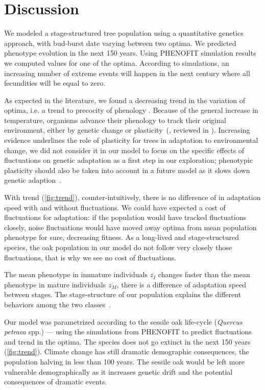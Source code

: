 \label{sec:Disc}
\section*{Discussion}

We modeled a stage-structured tree population using a quantitative genetics approach, with bud-burst date varying between two optima. We predicted phenotype evolution in the next 150 years. Using \textsc{PHENOFIT} simulation results we computed values for one of the optima. According to simulations, an increasing number of extreme events will happen in the next century where all fecundities will be equal to zero.

As expected in the literature, we found a decreasing trend in the variation of optima, i.e. a trend to precocity of phenology \citep{aitken_adaptation_2008, ehrlen_timing_2009}. Because of the general increase in temperature, organisms advance their phenology to track their original environment, either by genetic change or plasticity~(\citealt{savolainen_genetic_2004}, reviewed in \citealt{merila_climate_2014}). Increasing evidence underlines the role of plasticity for trees in adaptation to environmental change, we did not consider it in our model to focus on the specific effects of fluctuations on genetic adaptation as a first step in our exploration; phenotypic plasticity should also be taken into account in a future model as it slows down genetic adaption~\citep{alberto_potential_2013, aitken_adaptation_2008}. 

With trend (\autoref{fig:trend}), counter-intuitively, there is no difference of in adaptation speed with and without fluctuations. We could have expected a cost of fluctuations for adaptation: if the population would have tracked fluctuations closely, noise fluctuations would have moved away optima from mean population phenotype for sure, decreasing fitness. As a long-lived and stage-structured species, the oak population in our model do not follow very closely those fluctuations, that is why we see no cost of fluctuations.

The mean phenotype in immature individuals $\overline{z_I}$ changes faster than the mean phenotype in mature individuals $\overline{z_M}$, there is a difference of adaptation speed between stages. The stage-structure of our population explains the different behaviors among the two classes~\citep{cotto_maladaptation_2014}.

Our model was parametrized according to the sessile oak life-cycle (\textit{Quercus petraea} spp.) — using the simulations from \textsc{PHENOFIT} to predict fluctuations and trend in the optima. The species does not go extinct in the next 150 years (\autoref{fig:trend}). Climate change has still dramatic demographic consequences, the population halving in less than 100 years. The sessile oak would be left more vulnerable demographically as it increases genetic drift and the potential consequences of dramatic events.

